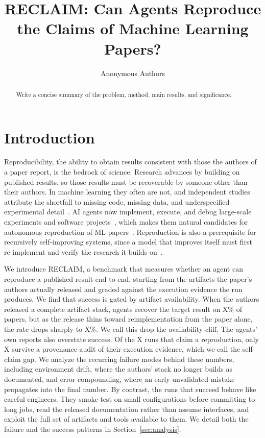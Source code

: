 \documentclass{article} %
\title{RECLAIM: Can Agents Reproduce the Claims of Machine Learning Papers?}
\author{Anonymous Authors}
\begin{document}
\maketitle

\begin{abstract}
Write a concise summary of the problem, method, main results, and significance.
\end{abstract}

\section{Introduction}
\label{sec:introduction}

Reproducibility, the ability to obtain results consistent with those the
authors of a paper report, is the bedrock of science. Research advances by
building on published results, so those results must be recoverable by
someone other than their authors. In machine learning they often are not,
and independent studies attribute the shortfall to missing code, missing
data, and underspecified experimental
detail~\citep{gundersen2018state,raff2019step,pineau2021improving,
gundersen2022sources}. AI agents now implement, execute, and debug
large-scale experiments and software
projects~\citep{jimenez2024swebench,chan2024mlebench,
merrill2026terminalbench}, which makes them natural candidates for
autonomous reproduction of ML
papers~\citep{siegel2024corebench,starace2025paperbench}. Reproduction is
also a prerequisite for recursively self-improving systems, since a model
that improves itself must first re-implement and verify the research it
builds on~\citep{favaro2026recursive}.

We introduce RECLAIM, a benchmark that measures whether an agent can
reproduce a published result end to end, starting from the artifacts the
paper's authors actually released and graded against the execution
evidence the run produces. We find that success is gated by artifact
availability. When the authors released a complete artifact stack, agents
recover the target result on X\% of papers, but as the release thins
toward reimplementation from the paper alone, the rate drops sharply to
X\%. We call this drop the availability cliff. The agents' own reports
also overstate success. Of the X runs that claim a reproduction, only X
survive a provenance audit of their execution evidence, which we call the
self-claim gap. We analyze the recurring failure modes behind these
numbers, including environment drift, where the authors' stack no longer
builds as documented, and error compounding, where an early unvalidated
mistake propagates into the final number. By contrast, the runs that
succeed behave like careful engineers. They smoke test on small
configurations before committing to long jobs, read the released
documentation rather than assume interfaces, and exploit the full set of
artifacts and tools available to them. We detail both the failure and the
success patterns in Section~\ref{sec:analysis}.
\end{document}
